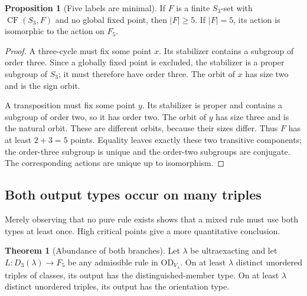 \documentclass[11pt,letterpaper]{article}
\theoremstyle{definition}
\newtheorem{theorem}[definition]{Theorem}
\newtheorem{proposition}[definition]{Proposition}
\numberwithin{equation}{section}
\newcommand{\OD}{\mathrm{OD}}
\newcommand{\CF}{\operatorname{CF}}
\begin{document}
\begin{proposition}[Five labels are minimal]\label{prop:five}
If $F$ is a finite $S_3$-set with $\CF(S_3,F)$ and no global fixed point, then $|F|\ge5$. If $|F|=5$, its action is isomorphic to the action on $F_5$.
\end{proposition}

\begin{proof}
A three-cycle must fix some point $x$. Its stabilizer contains a subgroup of order three. Since a globally fixed point is excluded, the stabilizer is a proper subgroup of $S_3$; it must therefore have order three. The orbit of $x$ has size two and is the sign orbit.

A transposition must fix some point $y$. Its stabilizer is proper and contains a subgroup of order two, so it has order two. The orbit of $y$ has size three and is the natural orbit. These are different orbits, because their sizes differ. Thus $F$ has at least $2+3=5$ points. Equality leaves exactly these two transitive components; the order-three subgroup is unique and the order-two subgroups are conjugate. The corresponding actions are unique up to isomorphism.
\end{proof}

\subsection{Both output types occur on many triples}

Merely observing that no pure rule exists shows that a mixed rule must use both types at least once. High critical points give a more quantitative conclusion.

\begin{theorem}[Abundance of both branches]\label{thm:bothbranches}
Let $\lambda$ be ultraexacting and let $L:D_3(\lambda)\to F_5$ be any admissible rule in $\OD_{V_\lambda}$. On at least $\lambda$ distinct unordered triples of classes, its output has the distinguished-member type. On at least $\lambda$ distinct unordered triples, its output has the orientation type.
\end{theorem}
\end{document}
